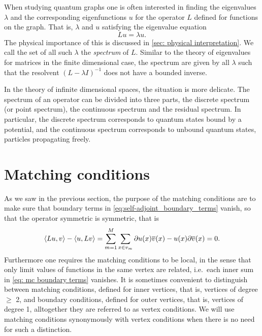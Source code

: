 When studying quantum graphs one is often interested in finding the eigenvalues $\lambda$ and the corresponding eigenfunctions $u$ for the operator $L$ defined for functions on the graph. That is, $\lambda$ and $u$ satisfying the eigenvalue equation
\[ Lu = \lambda u. \]
The physical importance of this is discussed in \cref{sec: physical interpretation}. We call the set of all such $\lambda$ the \emph{spectrum} of $L$. Similar to the theory of eigenvalues for matrices in the finite dimensional case, the spectrum are given by all $\lambda$ such that the resolvent $(L-\lambda I)^{-1}$ does not have a bounded inverse.

In the theory of infinite dimensional spaces, the situation is more delicate. The spectrum of an operator can be divided into three parts, the discrete spectrum (or point spectrum), the continuous spectrum and the residual spectrum. In particular, the discrete spectrum corresponds to quantum states bound by a potential, and the continuous spectrum corresponds to unbound quantum states, particles propagating freely.



\section{Matching conditions}\label{sec: mc}

As we saw in the previous section, the purpose of the matching conditions are to make sure that boundary terms in \eqref{eq:self-adjoint_boundary_terms} vanish, so that the operator symmetric is symmetric, that is
\begin{equation}\label{eq: mc boundary terms}
  \langle Lu, v \rangle - \langle u, Lv \rangle = \sum_{m=1}^{M} \sum_{x \in v_m} \partial u(x)\overline{v}(x) - u(x)\partial\overline{v}(x) = 0.
\end{equation}
Furthermore one requires the matching conditions to be local, in the sense that only limit values of functions in the same vertex are related, i.e.\ each inner sum in \eqref{eq: mc boundary terms} vanishes. It is sometimes convenient to distinguish between matching conditions, defined for inner vertices, that is, vertices of degree $\ge$ 2, and boundary conditions, defined for outer vertices, that is, vertices of degree 1, alltogether they are referred to as vertex conditions. We will use matching conditions synonymously with vertex conditions when there is no need for such a distinction.

